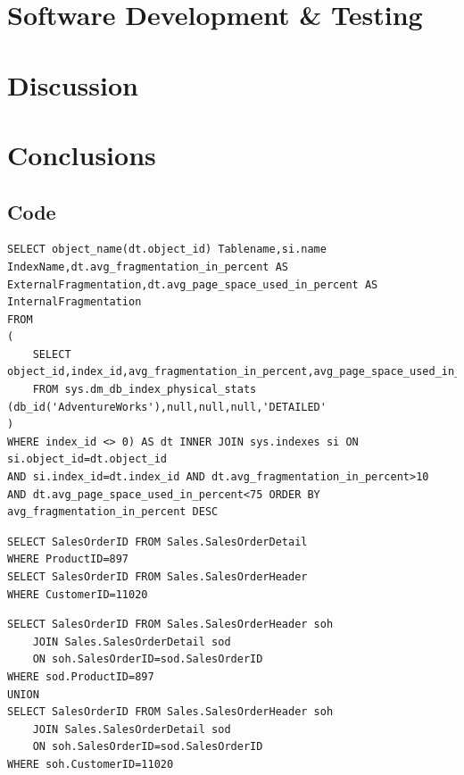 \documentclass{cslthse-msc}
\begin{document}
\chapter{Software Development \& Testing}

\chapter{Discussion}

\chapter{Conclusions}




\begin{appendices}

\chapter{Code}
\begin{lstlisting}[caption={Algorithm to find fragmented tables and the fragmentation values},label=See DB-Fragmentation]
SELECT object_name(dt.object_id) Tablename,si.name
IndexName,dt.avg_fragmentation_in_percent AS
ExternalFragmentation,dt.avg_page_space_used_in_percent AS
InternalFragmentation
FROM
(
    SELECT object_id,index_id,avg_fragmentation_in_percent,avg_page_space_used_in_percent
    FROM sys.dm_db_index_physical_stats (db_id('AdventureWorks'),null,null,null,'DETAILED'
)
WHERE index_id <> 0) AS dt INNER JOIN sys.indexes si ON si.object_id=dt.object_id
AND si.index_id=dt.index_id AND dt.avg_fragmentation_in_percent>10
AND dt.avg_page_space_used_in_percent<75 ORDER BY avg_fragmentation_in_percent DESC
\end{lstlisting}
\label{lst:fragalg}

\begin{lstlisting}[caption={Example of broken-down query, instead of OR operator in WHERE clause on two different tables},label=firstbreak-down]
SELECT SalesOrderID FROM Sales.SalesOrderDetail
WHERE ProductID=897
SELECT SalesOrderID FROM Sales.SalesOrderHeader
WHERE CustomerID=11020
\end{lstlisting}
\newpage
\begin{lstlisting}[caption={UNION instead of OR},label=second-down]
SELECT SalesOrderID FROM Sales.SalesOrderHeader soh
	JOIN Sales.SalesOrderDetail sod
	ON soh.SalesOrderID=sod.SalesOrderID
WHERE sod.ProductID=897
UNION
SELECT SalesOrderID FROM Sales.SalesOrderHeader soh
	JOIN Sales.SalesOrderDetail sod
	ON soh.SalesOrderID=sod.SalesOrderID
WHERE soh.CustomerID=11020
\end{lstlisting} 
\label{lst:union}


\end{appendices}
\end{document}

